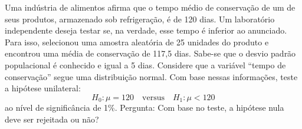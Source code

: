 %
%


\begin{exercicioBanco}[\valorquestao]
    Uma indústria de alimentos afirma que o tempo médio de conservação de um de seus produtos, armazenado sob refrigeração, é de 120 dias. Um laboratório independente deseja testar se, na verdade, esse tempo é inferior ao anunciado. Para isso, selecionou uma amostra aleatória de 25 unidades do produto e encontrou uma média de conservação de 117{,}5 dias. Sabe-se que o desvio padrão populacional é conhecido e igual a 5 dias. Considere que a variável ``tempo de conservação'' segue uma distribuição normal. Com base nessas informações, teste a hipótese unilateral:
%
\[
    H_0: \mu = 120 \quad \text{versus} \quad H_1: \mu < 120
\]
%
ao nível de significância de 1\%. Pergunta: Com base no teste, a hipótese nula deve ser rejeitada ou não?
\end{exercicioBanco}

